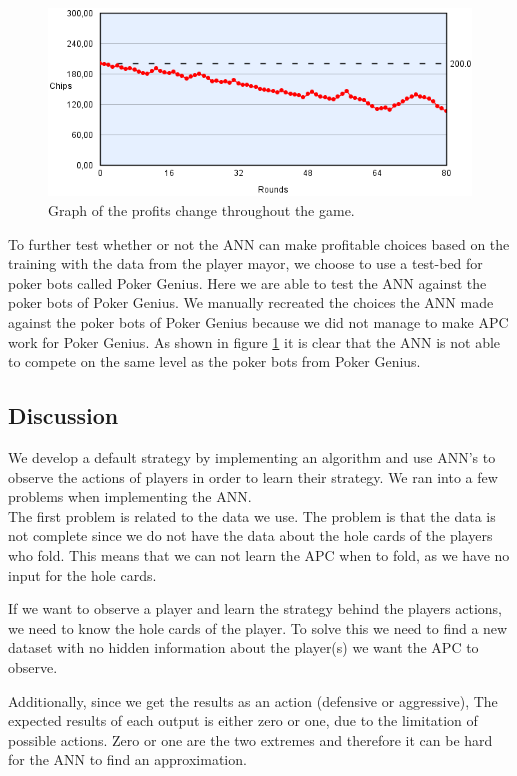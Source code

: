 \begin{figure}[H]
  \center
    \includegraphics[scale=0.7]{images/nn/finaltest.png}
  \caption{Graph of the profits change throughout the game.\label{fig:finaltest}}
\end{figure}

To further test whether or not the ANN can make profitable choices based on the training with the data from the player mayor, we choose to use a test-bed for poker bots called Poker Genius. Here we are able to test the ANN against the poker bots of Poker Genius. We manually recreated the choices the ANN made against the poker bots of Poker Genius because we did not manage to make APC work for Poker Genius. As shown in figure \ref{fig:finaltest} it is clear that the ANN is not able to compete on the same level as the poker bots from Poker Genius.


\subsection{Discussion}
We develop a default strategy by implementing an algorithm and use ANN's to observe the actions of players in order to learn their strategy. We ran into a few problems when implementing the ANN.\\

The first problem is related to the data we use. The problem is that  the data is not complete since we do not have the data about the hole cards of the players who fold. This means that we can not learn the APC when to fold, as we have no input for the hole cards. 

If we want to observe a player and learn the strategy behind the players actions, we need to know the hole cards of the player. To solve this we need to find a new dataset with no hidden information about the player(s) we want the APC to observe.

Additionally, since we get the results as an action (defensive or aggressive), The expected results of each output is either zero or one, due to the limitation of possible actions. Zero or one are the two extremes and therefore it can be hard for the ANN to find an approximation. 

